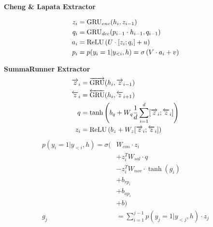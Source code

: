 \textbf{Cheng \& Lapata Extractor} 

\begin{align}
    z_i &= \operatorname{GRU}_{enc}(h_i, z_{i-1}) \\
    q_i &= \operatorname{GRU}_{dec}(p_{i-1} \cdot h_{i-1}, q_{i-1}) \\
   a_i &= \operatorname{ReLU}\left(U \cdot [z_i; q_i] + u \right)\\
    p_i &= p(y_i=1|y_{<i}, h) = \sigma\left(V\cdot a_i + v  \right) 
\end{align}


\textbf{SummaRunner Extractor}
\begin{align}
    \overrightarrow{z}_i &= \overrightarrow{\operatorname{GRU}}(h_i, \overrightarrow{z}_{i-1}) \\
    \overleftarrow{z}_i &= \overleftarrow{\operatorname{GRU}}(h_i, \overleftarrow{z}_{i+1}) \\
    q &= \tanh\left(b_q + W_q\frac{1}{d}\sum_{i=1}^{d} [\overrightarrow{z}_i; \overleftarrow{z}_i] \right)\\
    z_i &= \operatorname{ReLU}\left(b_z + W_z [\overrightarrow{z}_i; \overleftarrow{z}_i]\right)
  \end{align}
  \begin{align*}
      p(y_i=1|y_{<i}, h) = \sigma(& W_{con}\cdot z_i \\
                     & + z_i^T W_{sal}\cdot q \\
                     & -z_i^T W_{nov} \cdot \tanh(g_i) \\
                     & + b_{rp_i}  \\
                     & + b_{ap_i} \\
                     & + b)     \\
      g_j & = \sum_{i=1}^{j-1} p(y_j=1|y_{<j},h) \cdot z_j
\end{align*}


